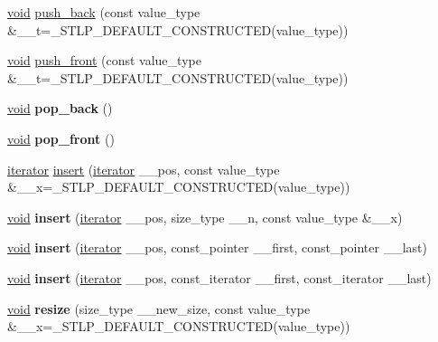 \begin{DoxyCompactItemize}
\item 
\hyperlink{interfacevoid}{void} \hyperlink{classdeque_ad0624acc579c05c1df04b107fe283bb9}{push\+\_\+back} (const value\+\_\+type \&\+\_\+\+\_\+t=\+\_\+\+S\+T\+L\+P\+\_\+\+D\+E\+F\+A\+U\+L\+T\+\_\+\+C\+O\+N\+S\+T\+R\+U\+C\+T\+ED(value\+\_\+type))
\item 
\hyperlink{interfacevoid}{void} \hyperlink{classdeque_acb102fac10501dc695a496beca93a9da}{push\+\_\+front} (const value\+\_\+type \&\+\_\+\+\_\+t=\+\_\+\+S\+T\+L\+P\+\_\+\+D\+E\+F\+A\+U\+L\+T\+\_\+\+C\+O\+N\+S\+T\+R\+U\+C\+T\+ED(value\+\_\+type))
\item 
\mbox{\label{classdeque_ae7ae8102a53e4f72f853de9e79aa76df}} 
\hyperlink{interfacevoid}{void} {\bfseries pop\+\_\+back} ()
\item 
\mbox{\label{classdeque_a2d248dbded70706ad477b8548a9ffa7f}} 
\hyperlink{interfacevoid}{void} {\bfseries pop\+\_\+front} ()
\item 
\hyperlink{structiterator}{iterator} \hyperlink{classdeque_a74f0345cf9468b0700654de0845dfb00}{insert} (\hyperlink{structiterator}{iterator} \+\_\+\+\_\+pos, const value\+\_\+type \&\+\_\+\+\_\+x=\+\_\+\+S\+T\+L\+P\+\_\+\+D\+E\+F\+A\+U\+L\+T\+\_\+\+C\+O\+N\+S\+T\+R\+U\+C\+T\+ED(value\+\_\+type))
\item 
\mbox{\label{classdeque_ac4bfac374cf3c088591ca63ad9855ed6}} 
\hyperlink{interfacevoid}{void} {\bfseries insert} (\hyperlink{structiterator}{iterator} \+\_\+\+\_\+pos, size\+\_\+type \+\_\+\+\_\+n, const value\+\_\+type \&\+\_\+\+\_\+x)
\item 
\mbox{\label{classdeque_aba5e9df16b3c18cae9628c7cc824880e}} 
\hyperlink{interfacevoid}{void} {\bfseries insert} (\hyperlink{structiterator}{iterator} \+\_\+\+\_\+pos, const\+\_\+pointer \+\_\+\+\_\+first, const\+\_\+pointer \+\_\+\+\_\+last)
\item 
\mbox{\label{classdeque_aeefb933214dbfacf968ebbe4fce9a154}} 
\hyperlink{interfacevoid}{void} {\bfseries insert} (\hyperlink{structiterator}{iterator} \+\_\+\+\_\+pos, const\+\_\+iterator \+\_\+\+\_\+first, const\+\_\+iterator \+\_\+\+\_\+last)
\item 
\mbox{\label{classdeque_a7239ec67868940d913e6ae389080c863}} 
\hyperlink{interfacevoid}{void} {\bfseries resize} (size\+\_\+type \+\_\+\+\_\+new\+\_\+size, const value\+\_\+type \&\+\_\+\+\_\+x=\+\_\+\+S\+T\+L\+P\+\_\+\+D\+E\+F\+A\+U\+L\+T\+\_\+\+C\+O\+N\+S\+T\+R\+U\+C\+T\+ED(value\+\_\+type))

\end{DoxyCompactItemize}
